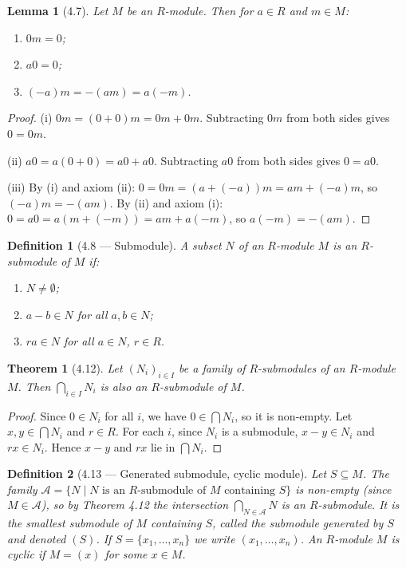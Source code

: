 \documentclass[12pt]{article}
\newtheorem{theorem}{Theorem}
\newtheorem{lemma}{Lemma}
\newtheorem{definition}{Definition}
\begin{document}
\begin{lemma}[4.7]
Let $M$ be an $R$-module. Then for $a \in R$ and $m \in M$:
\begin{enumerate}[label=(\roman*)]
  \item $0m = 0$;
  \item $a0 = 0$;
  \item $(-a)m = -(am) = a(-m)$.
\end{enumerate}
\end{lemma}

\begin{proof}
(i) $0m = (0 + 0)m = 0m + 0m$. Subtracting $0m$ from both sides gives $0 = 0m$.

(ii) $a0 = a(0 + 0) = a0 + a0$. Subtracting $a0$ from both sides gives $0 = a0$.

(iii) By (i) and axiom (ii): $0 = 0m = (a + (-a))m = am + (-a)m$, so $(-a)m = -(am)$.
By (ii) and axiom (i): $0 = a0 = a(m + (-m)) = am + a(-m)$, so $a(-m) = -(am)$.
\end{proof}

\begin{definition}[4.8 — Submodule]
A subset $N$ of an $R$-module $M$ is an \emph{$R$-submodule} of $M$ if:
\begin{enumerate}[label=(\roman*)]
  \item $N \neq \emptyset$;
  \item $a - b \in N$ for all $a, b \in N$;
  \item $ra \in N$ for all $a \in N$, $r \in R$.
\end{enumerate}
\end{definition}

\begin{theorem}[4.12]
Let $(N_i)_{i \in I}$ be a family of $R$-submodules of an $R$-module $M$. Then $\bigcap_{i \in I} N_i$ is also an $R$-submodule of $M$.
\end{theorem}

\begin{proof}
Since $0 \in N_i$ for all $i$, we have $0 \in \bigcap N_i$, so it is non-empty. Let $x, y \in \bigcap N_i$ and $r \in R$. For each $i$, since $N_i$ is a submodule, $x - y \in N_i$ and $rx \in N_i$. Hence $x - y$ and $rx$ lie in $\bigcap N_i$.
\end{proof}

\begin{definition}[4.13 — Generated submodule, cyclic module]
Let $S \subseteq M$. The family $\mathcal{A} = \{N \mid N \text{ is an } R\text{-submodule of } M \text{ containing } S\}$ is non-empty (since $M \in \mathcal{A}$), so by Theorem 4.12 the intersection $\bigcap_{N \in \mathcal{A}} N$ is an $R$-submodule. It is the \emph{smallest} submodule of $M$ containing $S$, called the submodule \emph{generated by $S$} and denoted $(S)$. If $S = \{x_1, \ldots, x_n\}$ we write $(x_1, \ldots, x_n)$. An $R$-module $M$ is \emph{cyclic} if $M = (x)$ for some $x \in M$.
\end{definition}
\end{document}
